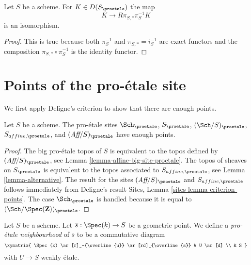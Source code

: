 \begin{lemma}
\label{lemma-cohomological-descent-proetale}
Let $S$ be a scheme. For $K \in D(S_\proetale)$ the map
$$
K \longrightarrow R\pi_{S, *}\pi_S^{-1}K
$$
is an isomorphism.
\end{lemma}

\begin{proof}
This is true because both $\pi_S^{-1}$ and $\pi_{S, *} = i_S^{-1}$
are exact functors and the composition $\pi_{S, *} \circ \pi_S^{-1}$
is the identity functor.
\end{proof}






















\section{Points of the pro-\'etale site}
\label{section-points}

\noindent
We first apply Deligne's criterion to show that there are enough points.

\begin{lemma}
\label{lemma-points-proetale}
Let $S$ be a scheme. The pro-\'etale sites $\Sch_\proetale$,
$S_\proetale$, $(\Sch/S)_\proetale$, $S_{affine, \proetale}$, and
$(\textit{Aff}/S)_\proetale$ have enough points.
\end{lemma}

\begin{proof}
The big pro-\'etale topos of $S$ is equivalent to the topos defined by
$(\textit{Aff}/S)_\proetale$, see
Lemma \ref{lemma-affine-big-site-proetale}.
The topos of sheaves on $S_\proetale$ is equivalent to the topos
associated to $S_{affine, \proetale}$, see
Lemma \ref{lemma-alternative}.
The result for the sites $(\textit{Aff}/S)_\proetale$ and
$S_{affine, \proetale}$ follows immediately from Deligne's result
Sites, Lemma \ref{sites-lemma-criterion-points}.
The case $\Sch_\proetale$ is handled because it is equal to
$(\Sch/\Spec(\mathbf{Z}))_\proetale$.
\end{proof}

\noindent
Let $S$ be a scheme. Let $\overline{s} : \Spec(k) \to S$ be a geometric
point. We define a {\it pro-\'etale neighbourhood} of $\overline{s}$
to be a commutative diagram
$$
\xymatrix{
\Spec(k) \ar[r]_-{\overline{u}} \ar[rd]_{\overline{s}} & U \ar[d] \\
& S
}
$$
with $U \to S$ weakly \'etale.

